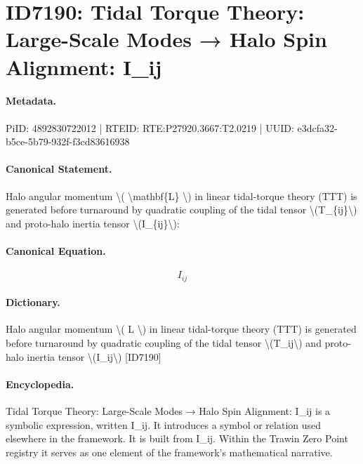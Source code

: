 \section*{ID7190: Tidal Torque Theory: Large-Scale Modes → Halo Spin Alignment: I\_ij}
\paragraph{Metadata.}
PiID: 4892830722012 | RTEID: RTE:P27920.3667:T2.0219 | UUID: e3dcfa32-b5ce-5b79-932f-f3cd83616938

\paragraph{Canonical Statement.}
Halo angular momentum \textbackslash{}( \textbackslash{}mathbf\{L\} \textbackslash{}) in linear tidal-torque theory (TTT) is generated before turnaround by quadratic coupling of the tidal tensor \textbackslash{}(T\_\{ij\}\textbackslash{}) and proto-halo inertia tensor \textbackslash{}(I\_\{ij\}\textbackslash{}):

\paragraph{Canonical Equation.}
\[
I_{ij}
\]

\paragraph{Dictionary.}
Halo angular momentum \textbackslash{}( L \textbackslash{}) in linear tidal-torque theory (TTT) is generated before turnaround by quadratic coupling of the tidal tensor \textbackslash{}(T\_ij\textbackslash{}) and proto-halo inertia tensor \textbackslash{}(I\_ij\textbackslash{}) [ID7190]

\paragraph{Encyclopedia.}
Tidal Torque Theory: Large-Scale Modes → Halo Spin Alignment: I\_ij is a symbolic expression, written I\_ij. It introduces a symbol or relation used elsewhere in the framework. It is built from I\_ij. Within the Trawin Zero Point registry it serves as one element of the framework's mathematical narrative.

